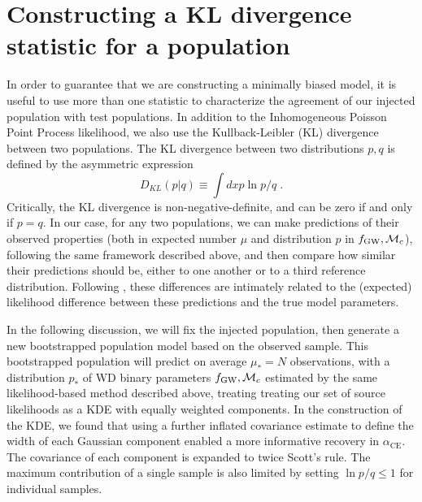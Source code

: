 \documentclass[twocolumn]{aastex631}
\newcommand*{\alphaCE}{\alpha_{\mathrm{CE}}}
\begin{document}
 \section{Constructing a KL divergence statistic for a population}
\label{sec:kl}
In order to guarantee that we are constructing a minimally biased model,
    it is useful to use more than one statistic
    to characterize the agreement of our injected population
    with test populations.
In addition to the Inhomogeneous Poisson Point Process likelihood,
    we also use the Kullback-Leibler (KL) divergence 
    \citep{KL-div}
    between two populations.   The KL divergence between two distributions $p,q$ is defined by the asymmetric expression
\begin{equation}
D_{KL}(p|q)\equiv \int dx p \ln p/q  \; .
\end{equation}
Critically, the KL divergence is non-negative-definite, and can be zero if and only if $p=q$.
In our case, for any two populations, we can make predictions of their observed properties (both in expected number
$\mu$ and
distribution $p$ in $f_{\rm GW},{\cal M}_c$), following the same framework described above,  and then compare how similar their predictions should be, either  to one another or to
a third reference distribution.  
Following \citet{1204.3117}, these differences are intimately related to the (expected) likelihood difference between
these predictions and the true model parameters.

In the following discussion, we will fix the injected population, then generate a new bootstrapped population model
based on the observed sample.  This bootstrapped population will predict on average $\mu_*=N$ observations, with a
distribution $p_*$ of WD binary parameters $f_{\rm GW},{\cal M}_c$ estimated by the same likelihood-based method
described above, treating treating our set of source likelihoods
    as a KDE with equally weighted components.
In the construction of the KDE, we found that using a further inflated covariance estimate
    to define the width of each Gaussian component enabled a more informative recovery
    in $\alphaCE$.
The covariance of each component is expanded to twice Scott's rule.
The maximum contribution of a single sample is also limited by 
    setting $\ln p/q \leq 1$ for individual samples.
\end{document}
